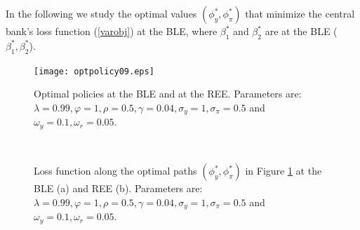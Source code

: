 In the following we study the optimal values  $(\phi_y^*, \phi_\pi^*)$ that minimize the central bank's loss function (\ref{varobj}) at the BLE, where $\beta_1^*$ and $\beta_2^*$ are at the BLE   ($\beta_1^*, \beta_2^*$).

\begin{figure}
    \begin{center}
     \texttt{[image: optpolicy09.eps]}
     \end{center}
   \caption{\label{opt09} Optimal policies at the BLE and at the REE. Parameters are: $\lambda=0.99, \varphi=1, \rho=0.5,\gamma=0.04,\sigma_y=1,\sigma_{\pi}=0.5$ and $\omega_y=0.1,\omega_r=0.05$.}
    \end{figure}


\begin{figure}
    \begin{center}
        \mbox{\quad
        }
   \end{center}
   \caption{\label{varopt09} Loss function along the optimal paths $(\phi_y^*, \phi_\pi^*)$ in Figure \ref{opt09} at the BLE (a) and REE (b). Parameters are:  $\lambda=0.99, \varphi=1, \rho=0.5,\gamma=0.04,\sigma_y=1,\sigma_{\pi}=0.5$ and $\omega_y=0.1,\omega_r=0.05$.}
    \end{figure}
    

